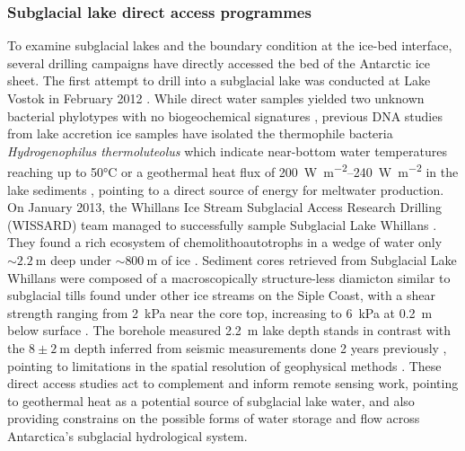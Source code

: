 

\subsubsection{Subglacial lake direct access programmes}

To examine subglacial lakes and the boundary condition at the ice-bed interface, several drilling campaigns have directly accessed the bed of the Antarctic ice sheet.
The first attempt to drill into a subglacial lake was conducted at Lake Vostok in February 2012 \citep{LukinTechnologicalaspectsfinal2014}.
While direct water samples yielded two unknown bacterial phylotypes with no biogeochemical signatures \citep{BulatMicrobiologysubglacialLake2016}, previous DNA studies from lake accretion ice samples have isolated the thermophile bacteria \emph{Hydrogenophilus thermoluteolus} which indicate near-bottom water temperatures reaching up to 50°C or a geothermal heat flux of \SIrange{200}{240}{\watt\per\metre\squared} in the lake sediments \citep{BulatDNAsignaturethermophilic2004,BulatProspectslifesubglacial2012,TalalayGeothermalheatflux2020}, pointing to a direct source of energy for meltwater production.
On January 2013, the Whillans Ice Stream Subglacial Access Research Drilling (WISSARD) team managed to successfully sample Subglacial Lake Whillans \citep{TulaczykWISSARDSubglacialLake2014}.
They found a rich ecosystem of chemolithoautotrophs in a wedge of water only $\sim\SI{2.2}{\metre}$ deep under $\sim\SI{800}{\metre}$ of ice \citep{ChristnermicrobialecosystemWest2014,MikuckiSubglacialLakeWhillans2016}.
Sediment cores retrieved from Subglacial Lake Whillans were composed of a macroscopically structure-less diamicton similar to subglacial tills found under other ice streams on the Siple Coast, with a shear strength ranging from \SI{2}{\kilo\pascal} near the core top, increasing to \SI{6}{\kilo\pascal} at \SI{0.2}{\metre} below surface \citep{TulaczykWISSARDSubglacialLake2014}.
The borehole measured \SI{2.2}{\metre} lake depth stands in contrast with the $8\pm\SI{2}{\metre}$ depth inferred from seismic measurements done 2 years previously \citep{HorganSubglacialLakeWhillans2012}, pointing to limitations in the spatial resolution of geophysical methods \citep{TulaczykWISSARDSubglacialLake2014}.
These direct access studies act to complement and inform remote sensing work, pointing to geothermal heat as a potential source of subglacial lake water, and also providing constrains on the possible forms of water storage and flow across Antarctica's subglacial hydrological system.

